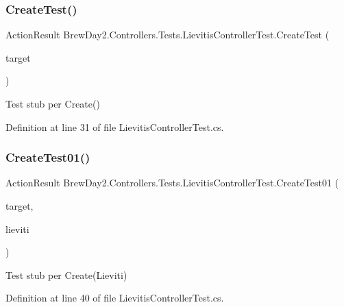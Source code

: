 \subsubsection{\texorpdfstring{Create\+Test()}{CreateTest()}}
{\footnotesize\ttfamily Action\+Result Brew\+Day2.\+Controllers.\+Tests.\+Lievitis\+Controller\+Test.\+Create\+Test (\begin{DoxyParamCaption}\item[{\mbox{[}\+Pex\+Assume\+Under\+Test\mbox{]} \mbox{\hyperlink{class_brew_day2_1_1_controllers_1_1_lievitis_controller}{Lievitis\+Controller}}}]{target }\end{DoxyParamCaption})}



Test stub per Create()



Definition at line 31 of file Lievitis\+Controller\+Test.\+cs.

\mbox{\label{class_brew_day2_1_1_controllers_1_1_tests_1_1_lievitis_controller_test_a0e016949ef6e991633a5bde9978cad29}} 
\subsubsection{\texorpdfstring{Create\+Test01()}{CreateTest01()}}
{\footnotesize\ttfamily Action\+Result Brew\+Day2.\+Controllers.\+Tests.\+Lievitis\+Controller\+Test.\+Create\+Test01 (\begin{DoxyParamCaption}\item[{\mbox{[}\+Pex\+Assume\+Under\+Test\mbox{]} \mbox{\hyperlink{class_brew_day2_1_1_controllers_1_1_lievitis_controller}{Lievitis\+Controller}}}]{target,  }\item[{\mbox{\hyperlink{class_brew_day2_1_1_models_1_1_lieviti}{Lieviti}}}]{lieviti }\end{DoxyParamCaption})}



Test stub per Create(\+Lieviti)



Definition at line 40 of file Lievitis\+Controller\+Test.\+cs.

